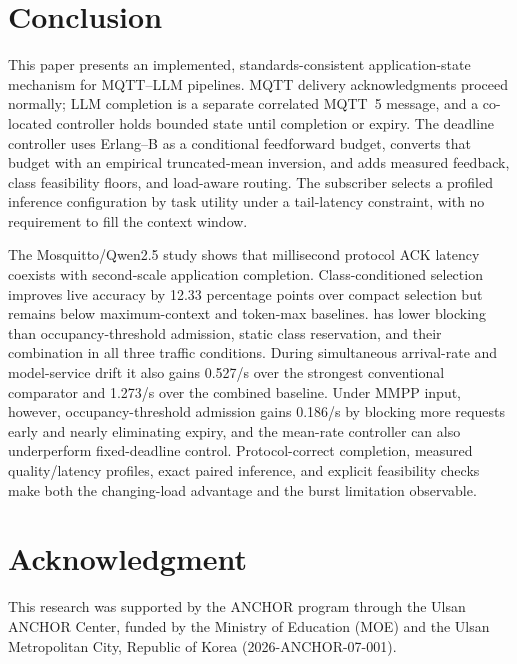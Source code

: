 \section{Conclusion}
\label{sec:conclusion}

This paper presents an implemented, standards-consistent application-state mechanism for MQTT--LLM pipelines. MQTT delivery acknowledgments proceed normally; LLM completion is a separate correlated MQTT~5 message, and a co-located controller holds bounded state until completion or expiry. The deadline controller uses Erlang--B as a conditional feedforward budget, converts that budget with an empirical truncated-mean inversion, and adds measured feedback, class feasibility floors, and load-aware routing. The subscriber selects a profiled inference configuration by task utility under a tail-latency constraint, with no requirement to fill the context window.

The Mosquitto/Qwen2.5 study shows that millisecond protocol ACK latency coexists with second-scale application completion. Class-conditioned selection improves live accuracy by 12.33 percentage points over compact selection but remains below maximum-context and token-max baselines. \method{} has lower blocking than occupancy-threshold admission, static class reservation, and their combination in all three traffic conditions. During simultaneous arrival-rate and model-service drift it also gains 0.527/s over the strongest conventional comparator and 1.273/s over the combined baseline. Under MMPP input, however, occupancy-threshold admission gains 0.186/s by blocking more requests early and nearly eliminating expiry, and the mean-rate controller can also underperform fixed-deadline control. Protocol-correct completion, measured quality/latency profiles, exact paired inference, and explicit feasibility checks make both the changing-load advantage and the burst limitation observable.

\section*{Acknowledgment}

This research was supported by the ANCHOR program through the Ulsan ANCHOR Center, funded by the Ministry of Education (MOE) and the Ulsan Metropolitan City, Republic of Korea (2026-ANCHOR-07-001).
